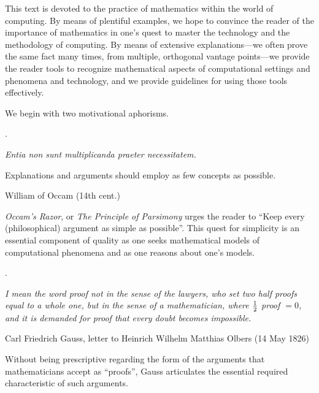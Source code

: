 This text is devoted to the practice of mathematics within the world
of computing.  By means of plentiful examples, we hope to convince the
reader of the importance of mathematics in one's quest to master the
technology and the methodology of computing.  By means of extensive
explanations---we often prove the same fact many times, from multiple,
orthogonal vantage points---we provide the reader tools to recognize
mathematical aspects of computational settings and phenomena and
technology, and we provide guidelines for using those tools
effectively.

We begin with two motivational aphorisms.

\medskip

.


\noindent
{\it Entia non sunt multiplicanda praeter necessitatem.}

Explanations and arguments should employ as few concepts as possible.

\hfill {\small William of Occam (14th cent.)} 

\smallskip

\noindent
{\it Occam's Razor}, or {\it The Principle of Parsimony} urges the
reader to ``Keep every (philosophical) argument as simple as
possible''.  This quest for simplicity is an essential component of
quality as one seeks mathematical models of computational phenomena
and as one reasons about one's models.

\medskip

.

\noindent
{\it I mean the word proof not in the sense of the lawyers, who set
  two half proofs equal to a whole one, but in the sense of a
  mathematician, where ${1 \over 2}$ proof $= 0$, and it is demanded
  for proof that every doubt becomes impossible.}

\hfill {\small Carl Friedrich Gauss,
  letter to Heinrich Wilhelm Matthias Olbers (14 May 1826)}

\smallskip

\noindent
Without being prescriptive regarding the form of the arguments that
mathematicians accept as ``proofs'', Gauss articulates the essential
required characteristic of such arguments.

\bigskip

